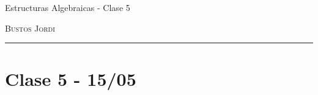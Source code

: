 \documentclass[12pt,a4paper]{book}
\begin{document}
\renewcommand{\contentsname}{\vspace{0cm} Contenido \vspace{-2cm}}

\begin{titlepage}
    \vspace*{2cm}

    \noindent
    \vspace*{0.5cm}

    \vspace{1.5cm}
    \epigraph{Estructuras Algebraicas - Clase 5}%
    {\textsc{Bustos Jordi}}
    \null\vfill
    \vspace*{1cm}
    \noindent
    \hfill
    \begin{minipage}{0.7\linewidth}
        \begin{flushright}
            \printauthor
        \end{flushright}
    \end{minipage}
    \begin{minipage}{0.02\linewidth}
        \rule{1pt}{70pt}
    \end{minipage}
    \titlepagedecoration
\end{titlepage}

\let\cleardoublepage=\clearpage

\chapter{Clase 5 - 15/05 }


\nocite{*}
\end{document}
